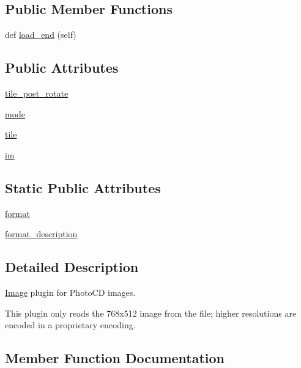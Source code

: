 \subsection*{Public Member Functions}
\begin{DoxyCompactItemize}
\item 
def \hyperlink{classPIL_1_1PcdImagePlugin_1_1PcdImageFile_a50870e8de2da4ddc9c1d53ebb5b25205}{load\+\_\+end} (self)
\end{DoxyCompactItemize}
\subsection*{Public Attributes}
\begin{DoxyCompactItemize}
\item 
\hyperlink{classPIL_1_1PcdImagePlugin_1_1PcdImageFile_ab2abb656f8a96c8dd4b4110e60fbf363}{tile\+\_\+post\+\_\+rotate}
\item 
\hyperlink{classPIL_1_1PcdImagePlugin_1_1PcdImageFile_a54370c54f0b4a69d2132a6d127c02575}{mode}
\item 
\hyperlink{classPIL_1_1PcdImagePlugin_1_1PcdImageFile_a003210aee7035f50ec6ff5279eb0c380}{tile}
\item 
\hyperlink{classPIL_1_1PcdImagePlugin_1_1PcdImageFile_a507fc89717a7e2682d08ee23f485ae85}{im}
\end{DoxyCompactItemize}
\subsection*{Static Public Attributes}
\begin{DoxyCompactItemize}
\item 
\hyperlink{classPIL_1_1PcdImagePlugin_1_1PcdImageFile_a35001edf397e48e72ec65ba9ae959e0e}{format}
\item 
\hyperlink{classPIL_1_1PcdImagePlugin_1_1PcdImageFile_a5355e2327457a8858cd48768f2dd8597}{format\+\_\+description}
\end{DoxyCompactItemize}


\subsection{Detailed Description}
\hyperlink{namespacePIL_1_1Image}{Image} plugin for Photo\+CD images. 

This plugin only reads the 768x512 image from the file; higher resolutions are encoded in a proprietary encoding. 

\subsection{Member Function Documentation}
\mbox{\label{classPIL_1_1PcdImagePlugin_1_1PcdImageFile_a50870e8de2da4ddc9c1d53ebb5b25205}} 

